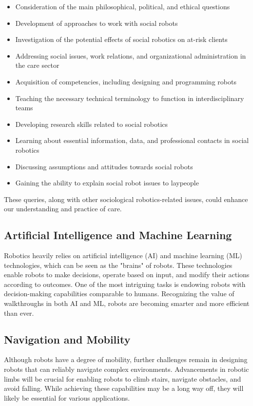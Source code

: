 \begin{itemize}
    \item Consideration of the main philosophical, political, and ethical questions
    \item Development of approaches to work with social robots
    \item Investigation of the potential effects of social robotics on at-risk clients
    \item Addressing social issues, work relations, and organizational administration in the care sector
    \item Acquisition of competencies, including designing and programming robots
    \item Teaching the necessary technical terminology to function in interdisciplinary teams
    \item Developing research skills related to social robotics
    \item Learning about essential information, data, and professional contacts in social robotics
    \item Discussing assumptions and attitudes towards social robots
    \item Gaining the ability to explain social robot issues to laypeople
\end{itemize}

These queries, along with other sociological robotics-related issues, could enhance our understanding and practice of care.

\subsection{Artificial Intelligence and Machine Learning}

Robotics heavily relies on artificial intelligence (AI) and machine learning (ML) technologies, which can be seen as the "brains" of robots. These technologies enable robots to make decisions, operate based on input, and modify their actions according to outcomes. One of the most intriguing tasks is endowing robots with decision-making capabilities comparable to humans. Recognizing the value of walkthroughs in both AI and ML, robots are becoming smarter and more efficient than ever.

\subsection{Navigation and Mobility}

Although robots have a degree of mobility, further challenges remain in designing robots that can reliably navigate complex environments. Advancements in robotic limbs will be crucial for enabling robots to climb stairs, navigate obstacles, and avoid falling. While achieving these capabilities may be a long way off, they will likely be essential for various applications.

